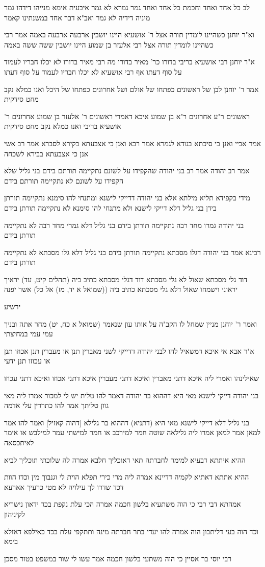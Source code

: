\documentclass[12pt, openany]{book}
\newcommand{\sethebfont}{
\fontsize{10.5pt}{21.0pt} \selectfont
}
\newcommand{\textblock}[1]{
{\sethebfont #1\\}	
}
\begin{document}
\textblock{לב כל אחד ואחד וחכמת כל אחד ואחד גמר גמרא לא גמר איבעית אימא מנייהו דידהו גמר מיניה דידיה לא גמר ואב"א דבר אחד במשנתינו קאמר}
\textblock{וא"ר יוחנן כשהיינו לומדין תורה אצל ר' אושעיא היינו יושבין ארבעה ארבעה באמה אמר רבי כשהיינו לומדין תורה אצל רבי אלעזר בן שמוע היינו יושבין ששה ששה באמה}
\textblock{א"ר יוחנן רבי אושעיא בריבי בדורו כר' מאיר בדורו מה רבי מאיר בדורו לא יכלו חבריו לעמוד על סוף דעתו אף רבי אושעיא לא יכלו חבריו לעמוד על סוף דעתו}
\textblock{אמר ר' יוחנן לבן של ראשונים כפתחו של אולם ושל אחרונים כפתחו של היכל ואנו כמלא נקב מחט סידקית}
\textblock{ראשונים ר"ע אחרונים ר"א בן שמוע איכא דאמרי ראשונים ר' אלעזר בן שמוע אחרונים ר' אושעיא בריבי ואנו כמלא נקב מחט סידקית}
\textblock{אמר אביי ואנן כי סיכתא בגודא לגמרא אמר רבא ואנן כי אצבעתא בקירא לסברא אמר רב אשי אנן כי אצבעתא בבירא לשכחה}
\textblock{אמר רב יהודה אמר רב בני יהודה שהקפידו על לשונם נתקיימה תורתם בידם בני גליל שלא הקפידו על לשונם לא נתקיימה תורתם בידם}
\textblock{מידי בקפידא תליא מילתא אלא בני יהודה דדייקי לישנא ומתנחי להו סימנא נתקיימה תורתן בידן בני גליל דלא דייקי לישנא ולא מתנחי להו סימנא לא נתקיימה תורתן בידם}
\textblock{בני יהודה גמרו מחד רבה נתקיימה תורתן בידם בני גליל דלא גמרי מחד רבה לא נתקיימה תורתן בידם}
\textblock{רבינא אמר בני יהודה דגלו מסכתא נתקיימה תורתן בידם בני גליל דלא גלו מסכתא לא נתקיימה תורתן בידם}
\textblock{דוד גלי מסכתא שאול לא גלי מסכתא דוד דגלי מסכתא כתיב ביה (תהלים קיט, עד) יראיך יראוני וישמחו שאול דלא גלי מסכתא כתיב ביה ((שמואל א יד, מז) אל כל) אשר יפנה}
\textblock{ירשיע}
\textblock{ואמר ר' יוחנן מניין שמחל לו הקב"ה על אותו עון שנאמר (שמואל א כח, יט) מחר אתה ובניך עמי עמי במחיצתי}
\textblock{א"ר אבא אי איכא דמשאיל להו לבני יהודה דדייקי לשני מאברין תנן או מעברין תנן אכוזו תנן או עכוזו תנן ידעי}
\textblock{שאילינהו ואמרי ליה איכא דתני מאברין ואיכא דתני מעברין איכא דתני אכוזו ואיכא דתני עכוזו}
\textblock{בני יהודה דייקי לישנא מאי היא דההוא בר יהודה דאמר להו טלית יש לי למכור אמרו ליה מאי גוון טליתך אמר להו כתרדין עלי אדמה}
\textblock{בני גליל דלא דייקי לישנא מאי היא (דתניא) דההוא בר גלילא [דהוה קאזיל] ואמר להו אמר למאן אמר למאן אמרו ליה גלילאה שוטה חמר למירכב או חמר למישתי עמר למילבש או אימר לאיתכסאה}
\textblock{ההיא איתתא דבעיא למימר לחברתה תאי דאוכליך חלבא אמרה לה שלוכתי תוכליך לביא}
\textblock{ההיא אתתא דאתיא לקמיה דדיינא אמרה ליה מרי כירי תפלא הוית לי וגנבוך מין וכדו הוות דכד שדרו לך עילויה לא מטי כרעיך אארעא}
\textblock{אמהתא דבי רבי כי הוה משתעיא בלשון חכמה אמרה הכי עלת נקפת בכד ידאון נישריא לקיניהון}
\textblock{וכד הוה בעי דליתבון הוה אמרה להו יעדי בתר חברתה מינה ותתקפי עלת בכד כאילפא דאזלא בימא}
\textblock{רבי יוסי בר אסיין כי הוה משתעי בלשון חכמה אמר עשו לי שור במשפט בטור מסכן}
\end{document}
